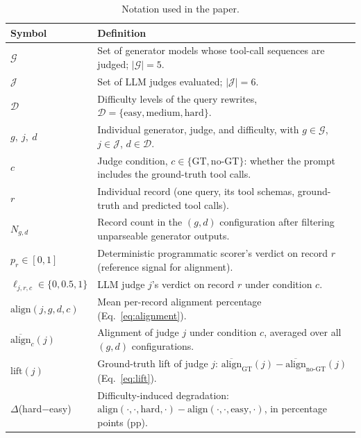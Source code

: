 \begin{table}[!htbp]
\centering
\small
\setlength{\tabcolsep}{6pt}
\renewcommand{\arraystretch}{1.15}
\begin{tabular}{@{}ll@{}}
\toprule
\textbf{Symbol} & \textbf{Definition} \\
\midrule
$\mathcal{G}$
  & Set of generator models whose tool-call sequences are judged; $|\mathcal{G}| = 5$. \\
$\mathcal{J}$
  & Set of LLM judges evaluated; $|\mathcal{J}| = 6$. \\
$\mathcal{D}$
  & Difficulty levels of the query rewrites, $\mathcal{D} = \{\text{easy}, \text{medium}, \text{hard}\}$. \\
$g,\ j,\ d$
  & Individual generator, judge, and difficulty, with $g \in \mathcal{G}$, $j \in \mathcal{J}$, $d \in \mathcal{D}$. \\
$c$
  & Judge condition, $c \in \{\text{GT}, \text{no-GT}\}$: whether the prompt includes the ground-truth tool calls. \\
$r$
  & Individual record (one query, its tool schemas, ground-truth and predicted tool calls). \\
$N_{g,d}$
  & Record count in the $(g, d)$ configuration after filtering unparseable generator outputs. \\
$p_r \in [0,1]$
  & Deterministic programmatic scorer's verdict on record $r$ (reference signal for alignment). \\
$\ell_{j,r,c} \in \{0, 0.5, 1\}$
  & LLM judge $j$'s verdict on record $r$ under condition $c$. \\
$\mathrm{align}(j, g, d, c)$
  & Mean per-record alignment percentage (Eq.~\ref{eq:alignment}). \\
$\overline{\mathrm{align}}_{c}(j)$
  & Alignment of judge $j$ under condition $c$, averaged over all $(g, d)$ configurations. \\
$\mathrm{lift}(j)$
  & Ground-truth lift of judge $j$: $\overline{\mathrm{align}}_{\text{GT}}(j) - \overline{\mathrm{align}}_{\text{no-GT}}(j)$ (Eq.~\ref{eq:lift}). \\
$\Delta$(hard$-$easy)
  & Difficulty-induced degradation: $\mathrm{align}(\cdot,\cdot,\text{hard},\cdot) - \mathrm{align}(\cdot,\cdot,\text{easy},\cdot)$, in percentage points (pp). \\
\bottomrule
\end{tabular}
\vspace{0.2cm}
\caption{Notation used in the paper.}
\label{tab:notation}
\end{table}

